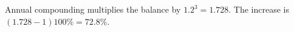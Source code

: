 Annual compounding multiplies the balance by $1.2^3=1.728$. The increase is $(1.728-1)100\%=\boxed{72.8\%}$.
